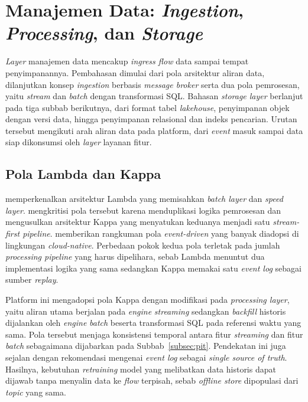 \section{Manajemen Data: \textit{Ingestion}, \textit{Processing}, dan \textit{Storage}}
\label{sec:manajemen-data}

\textit{Layer} manajemen data mencakup \textit{ingress flow} data sampai tempat penyimpanannya. Pembahasan dimulai dari pola arsitektur aliran data, dilanjutkan konsep \textit{ingestion} berbasis \textit{message broker} serta dua pola pemrosesan, yaitu \textit{stream} dan \textit{batch} dengan transformasi SQL. Bahasan \textit{storage layer} berlanjut pada tiga subbab berikutnya, dari format tabel \textit{lakehouse}, penyimpanan objek dengan versi data, hingga penyimpanan relasional dan indeks pencarian. Urutan tersebut mengikuti arah aliran data pada platform, dari \textit{event} masuk sampai data siap dikonsumsi oleh \textit{layer} layanan fitur.

\subsection{Pola Lambda dan Kappa}
\label{subsec:lambda-kappa}

\textcite{marz2015lambda} memperkenalkan arsitektur Lambda yang memisahkan \textit{batch layer} dan \textit{speed layer}. \textcite{kreps2014kafka} mengkritisi pola tersebut karena menduplikasi logika pemrosesan dan mengusulkan arsitektur Kappa yang menyatukan keduanya menjadi satu \textit{stream-first pipeline}. \textcite{aws2024edapatterns} memberikan rangkuman pola \textit{event-driven} yang banyak diadopsi di lingkungan \textit{cloud-native}. Perbedaan pokok kedua pola terletak pada jumlah \textit{processing pipeline} yang harus dipelihara, sebab Lambda menuntut dua implementasi logika yang sama sedangkan Kappa memakai satu \textit{event log} sebagai sumber \textit{replay}.

Platform ini mengadopsi pola Kappa dengan modifikasi pada \textit{processing layer}, yaitu aliran utama berjalan pada \textit{engine} \textit{streaming} sedangkan \textit{backfill} historis dijalankan oleh \textit{engine} \textit{batch} beserta transformasi SQL pada referensi waktu yang sama. Pola tersebut menjaga konsistensi temporal antara fitur \textit{streaming} dan fitur \textit{batch} sebagaimana dijabarkan pada Subbab~\ref{subsec:pit}. Pendekatan ini juga sejalan dengan rekomendasi \textcite{stopford2018designing} mengenai \textit{event log} sebagai \textit{single source of truth}. Hasilnya, kebutuhan \textit{retraining} model yang melibatkan data historis dapat dijawab tanpa menyalin data ke \textit{flow} terpisah, sebab \textit{offline store} dipopulasi dari \textit{topic} yang sama.

